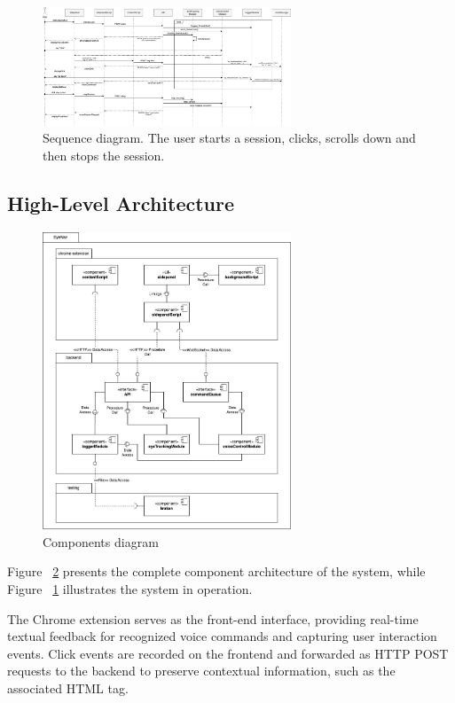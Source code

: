 \begin{figure}
    \centering
    \includegraphics[width=210pt]{imgs/sequence-diagram.jpg}
    \caption{Sequence diagram. The user starts a session, clicks, scrolls down and then stops the session.}
    \label{fig:sequence-diagram}
\end{figure}




\subsection{High-Level Architecture}

\begin{figure}
    \centering
    \includegraphics[width=210pt]{imgs/components-diagram.jpg}
    \caption{Components diagram}
    \label{fig:components-diagram}
\end{figure}


Figure ~\ref{fig:components-diagram} presents the complete component architecture of the system, while Figure ~\ref{fig:sequence-diagram} illustrates the system in operation.

The Chrome extension serves as the front-end interface, providing real-time textual feedback for recognized voice commands and capturing user interaction events. Click events are recorded on the frontend and forwarded as HTTP POST requests to the backend to preserve contextual information, such as the associated HTML tag. 

